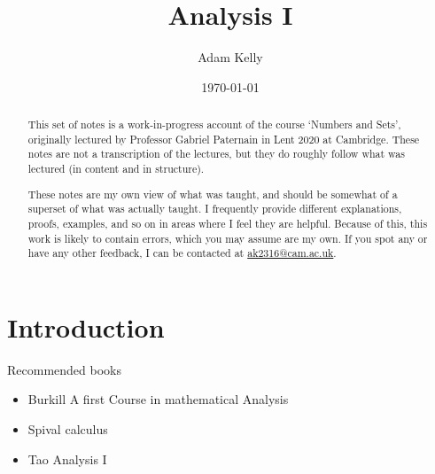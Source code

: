 \documentclass[a4paper]{scrreprt}
\title{Analysis I}
\author{Adam Kelly}
\date{\today}
\begin{document}
\maketitle

\begin{abstract}
	

	This set of notes is a work-in-progress account of the course `Numbers and Sets', originally lectured by Professor Gabriel Paternain in Lent 2020 at Cambridge. These notes are not a transcription of the lectures, but they do roughly follow what was lectured (in content and in structure).

	These notes are my own view of what was taught, and should be somewhat of a superset of what was actually taught. I frequently provide different explanations, proofs, examples, and so on in areas where I feel they are helpful. Because of this, this work is likely to contain errors, which you may assume are my own. If you spot any or have any other feedback, I can be contacted at \href{mailto:ak2316@cam.ac.uk}{ak2316@cam.ac.uk}.



\end{abstract}

\tableofcontents

\clearpage

\chapter{Introduction}



Recommended books
\begin{itemize}
	\item Burkill A first Course in mathematical Analysis
	\item Spival calculus
	\item Tao Analysis I
\end{itemize}
\end{document}
